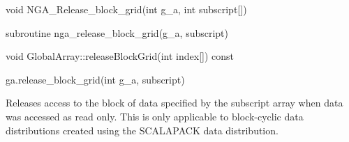 \documentclass[10pt]{article}
\begin{document}

\begin{capi}
\begin{ccode}
void NGA_Release_block_grid(int g_a, int subscript[])
\end{ccode}
\begin{funcargs}
\end{funcargs}
\end{capi}

\begin{fapi}
\begin{fcode}
subroutine nga_release_block_grid(g_a, subscript)
\end{fcode}
\begin{funcargs}
\end{funcargs}
\end{fapi}

\begin{cxxapi}
\begin{cxxcode}
void GlobalArray::releaseBlockGrid(int index[]) const
\end{cxxcode}
\begin{funcargs}
\end{funcargs}
\end{cxxapi}

\begin{pyapi}
\begin{pycode}
ga.release_block_grid(int g_a, subscript)
\end{pycode}
\begin{funcargs}
\end{funcargs}
\end{pyapi}

\local

\begin{desc}

Releases access to the block of data specified by the subscript array when data
was accessed as read only. This is only applicable to block-cyclic data
distributions created using the SCALAPACK data distribution.

\end{desc}
\end{document}
